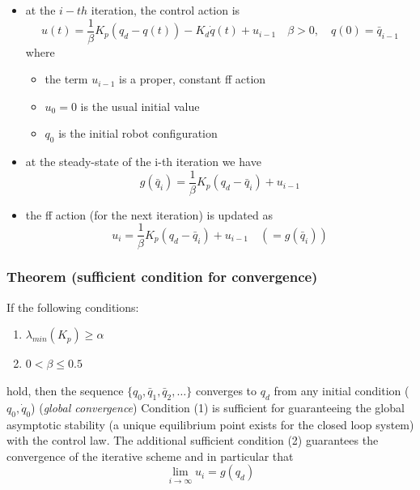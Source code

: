 \documentclass{book}
\begin{document}
\begin{itemize}
    \item at the $i-th$ iteration, the control action is \[
            u(t) =\displaystyle\frac{1}{\beta}K_p(q_d-q(t))-K_d\dot{q}(t)+u_{i-1} \quad \beta>0,\quad q(0)=\bar{q}_{i-1}
            \] where \begin{itemize}
            \item the term $u_{i-1}$ is a proper, constant ff action 
            \item $u_0=0$ is the usual initial value 
            \item $q_0$ is the initial robot configuration
        \end{itemize}
    \item at the steady-state of the i-th iteration we have 
        \[
            g(\bar{q}_i) = \displaystyle\frac{1}{\beta} K_p(q_d-\bar{q}_i)+u_{i-1}
        \]
        \item the ff action (for the next iteration) is updated as 
            \[
                u_i = \displaystyle\frac{1}{\beta}K_p(q_d-\bar{q}_i)+u_{i-1} \quad (=g(\bar{q}_i))
            \]
\end{itemize}
\subsubsection{Theorem (sufficient condition for convergence)}
If the following conditions:
\begin{enumerate}
    \item $\lambda_{min}(K_p)\geq \alpha$
    \item  $0<\beta\leq 0.5$
\end{enumerate}
hold, then the sequence $\{q_0,\bar{q}_1,\bar{q}_2,\dots\}$ converges to $q_d$ from any initial condition ($q_0,\dot{q}_0$) (\emph{global convergence})
Condition (1) is sufficient for guaranteeing the global asymptotic stability (a unique equilibrium point exists for the closed loop system) with the control law. The additional sufficient condition (2) guarantees the convergence of the iterative scheme and in particular that 
\[
    \lim_{i\to\infty} u_i = g(q_d)
\]
\end{document}
